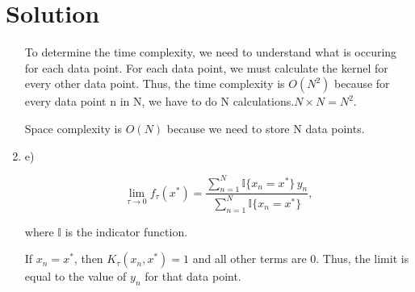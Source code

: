 \documentclass[submit]{../harvardml}
\newenvironment{solution}
  {\color{blue}\section*{Solution}}
{}
\begin{document}
\begin{solution}
\begin{enumerate}
  To determine the time complexity, we need to understand what is occuring for each data point. For each data point, we must calculate the kernel for every other data point. Thus, the time complexity is \(O(N^2)\) because for every data point n in N, we have to do N calculations.$ N \times N = N^2$. 

  Space complexity is \(O(N)\) because we need to store N data points.


  \item e)
  
   \[
    \lim_{\tau \to 0} f_\tau(x^*) = \frac{\sum_{n=1}^N \mathbb{I}\{x_n = x^*\}\, y_n}{\sum_{n=1}^N \mathbb{I}\{x_n = x^*\}},
    \]

    where \(\mathbb{I}\) is the indicator function.

      If \(x_n = x^*\), then \(K_\tau(x_n, x^*) = 1\) and all other terms are 0. Thus, the limit is equal to the value of \(y_n\) for that data point.


\end{enumerate}







\end{solution}
\end{document}
